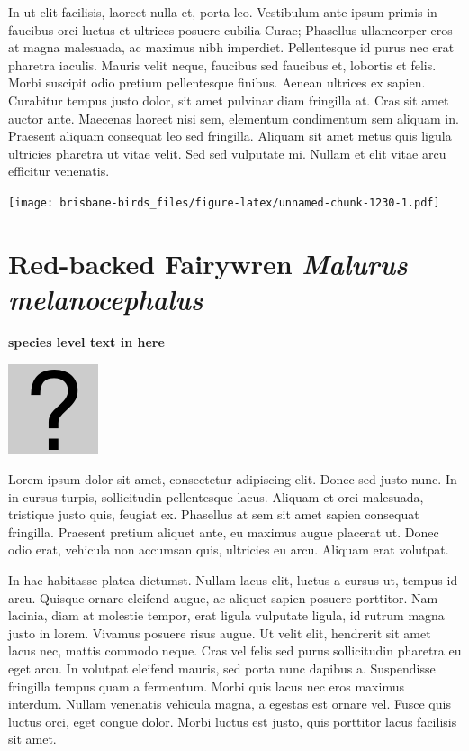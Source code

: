 \documentclass[]{book}
\let\origfigure\figure
\let\endorigfigure\endfigure
\renewenvironment{figure}[1][2] {
  \expandafter\origfigure\expandafter[H]
} {
  \endorigfigure
}
\begin{document}
In ut elit facilisis, laoreet nulla et, porta leo. Vestibulum ante ipsum
primis in faucibus orci luctus et ultrices posuere cubilia Curae;
Phasellus ullamcorper eros at magna malesuada, ac maximus nibh
imperdiet. Pellentesque id purus nec erat pharetra iaculis. Mauris velit
neque, faucibus sed faucibus et, lobortis et felis. Morbi suscipit odio
pretium pellentesque finibus. Aenean ultrices ex sapien. Curabitur
tempus justo dolor, sit amet pulvinar diam fringilla at. Cras sit amet
auctor ante. Maecenas laoreet nisi sem, elementum condimentum sem
aliquam in. Praesent aliquam consequat leo sed fringilla. Aliquam sit
amet metus quis ligula ultricies pharetra ut vitae velit. Sed sed
vulputate mi. Nullam et elit vitae arcu efficitur venenatis.

\begin{figure}
\centering
\texttt{[image: brisbane-birds\_files/figure-latex/unnamed-chunk-1230-1.pdf]}
\caption{\label{fig:unnamed-chunk-1230}insert figure caption}
\end{figure}

\section{\texorpdfstring{Red-backed Fairywren \emph{Malurus
melanocephalus}}{Red-backed Fairywren Malurus melanocephalus}}\label{red-backed-fairywren-malurus-melanocephalus}

\textbf{species level text in here}

\begin{figure}
\centering
\includegraphics{assets/missing.png}
\caption{No image for species}
\end{figure}

Lorem ipsum dolor sit amet, consectetur adipiscing elit. Donec sed justo
nunc. In in cursus turpis, sollicitudin pellentesque lacus. Aliquam et
orci malesuada, tristique justo quis, feugiat ex. Phasellus at sem sit
amet sapien consequat fringilla. Praesent pretium aliquet ante, eu
maximus augue placerat ut. Donec odio erat, vehicula non accumsan quis,
ultricies eu arcu. Aliquam erat volutpat.

In hac habitasse platea dictumst. Nullam lacus elit, luctus a cursus ut,
tempus id arcu. Quisque ornare eleifend augue, ac aliquet sapien posuere
porttitor. Nam lacinia, diam at molestie tempor, erat ligula vulputate
ligula, id rutrum magna justo in lorem. Vivamus posuere risus augue. Ut
velit elit, hendrerit sit amet lacus nec, mattis commodo neque. Cras vel
felis sed purus sollicitudin pharetra eu eget arcu. In volutpat eleifend
mauris, sed porta nunc dapibus a. Suspendisse fringilla tempus quam a
fermentum. Morbi quis lacus nec eros maximus interdum. Nullam venenatis
vehicula magna, a egestas est ornare vel. Fusce quis luctus orci, eget
congue dolor. Morbi luctus est justo, quis porttitor lacus facilisis sit
amet.
\end{document}
